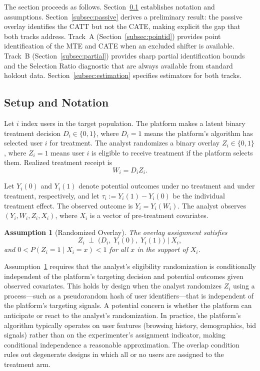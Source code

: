 \documentclass[11pt]{article}
\newtheorem{assumption}{Assumption}
\begin{document}
The section proceeds as follows.  Section~\ref{subsec:setup} establishes
notation and assumptions.  Section~\ref{subsec:passive} derives a preliminary
result: the passive overlay identifies the CATT but not the CATE, making
explicit the gap that both tracks address.  Track~A
(Section~\ref{subsec:pointid}) provides point identification of the MTE and
CATE when an excluded shifter is available.  Track~B
(Section~\ref{subsec:partial}) provides sharp partial identification bounds and
the Selection Ratio diagnostic that are always available from standard holdout
data.  Section~\ref{subsec:estimation} specifies estimators for both tracks.

\subsection{Setup and Notation}
\label{subsec:setup}

Let $i$ index users in the target population.  The platform makes a latent
binary treatment decision $D_i \in \{0,1\}$, where $D_i = 1$ means the
platform's algorithm has selected user $i$ for treatment.  The analyst randomizes
a binary overlay $Z_i \in \{0,1\}$, where $Z_i = 1$ means user $i$ is eligible
to receive treatment if the platform selects them.  Realized treatment receipt is
\[
  W_i = D_i Z_i.
\]

Let $Y_i(0)$ and $Y_i(1)$ denote potential outcomes under no treatment and under
treatment, respectively, and let $\tau_i := Y_i(1) - Y_i(0)$ be the individual
treatment effect.  The observed outcome is $Y_i = Y_i(W_i)$.  The analyst
observes $(Y_i, W_i, Z_i, X_i)$, where $X_i$ is a vector of pre-treatment
covariates.

\begin{assumption}[Randomized Overlay]
\label{ass:overlay}
The overlay assignment satisfies
\[
  Z_i \;\perp\; \bigl(D_i,\; Y_i(0),\; Y_i(1)\bigr) \;\Big|\; X_i,
\]
and $0 < P(Z_i = 1 \mid X_i = x) < 1$ for all $x$ in the support of $X_i$.
\end{assumption}

Assumption~\ref{ass:overlay} requires that the analyst's eligibility
randomization is conditionally independent of the platform's targeting decision
and potential outcomes given observed covariates.  This holds by design when the
analyst randomizes $Z_i$ using a process---such as a pseudorandom hash of user
identifiers---that is independent of the platform's targeting signals.  A
potential concern is whether the platform can anticipate or react to the
analyst's randomization.  In practice, the platform's algorithm typically
operates on user features (browsing history, demographics, bid signals) rather
than on the experimenter's assignment indicator, making conditional independence
a reasonable approximation.  The overlap condition rules out degenerate designs
in which all or no users are assigned to the treatment arm.
\end{document}
